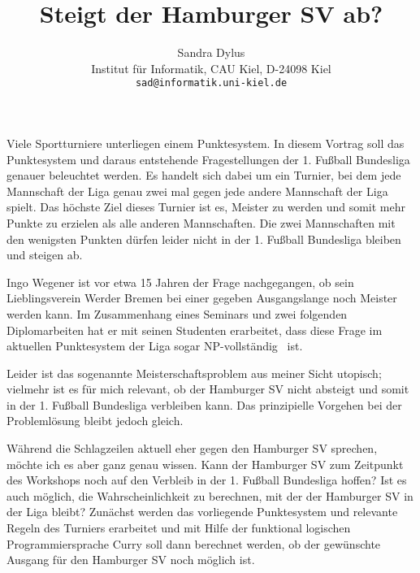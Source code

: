 \documentclass[
12pt, %
a4paper, %
oneside, %
]{scrartcl}
\title{Steigt der Hamburger SV ab?}
\author{Sandra Dylus\\Institut f\"ur Informatik, CAU Kiel, D-24098 Kiel\\\texttt{sad@informatik.uni-kiel.de}}
\date{}
\begin{document}
\maketitle

Viele Sportturniere unterliegen einem Punktesystem. %
In diesem Vortrag soll das Punktesystem und daraus entstehende
Fragestellungen der 1. Fu\ss{}ball Bundesliga genauer beleuchtet
werden. %
Es handelt sich dabei um ein Turnier, bei dem jede Mannschaft der Liga
genau zwei mal gegen jede andere Mannschaft der Liga spielt. %
Das h\"ochste Ziel dieses Turnier ist es, Meister zu werden und somit
mehr Punkte zu erzielen als alle anderen Mannschaften. %
Die zwei Mannschaften mit den wenigsten Punkten d\"urfen leider nicht
in der 1. Fu\ss{}ball Bundesliga bleiben und steigen ab. %

Ingo Wegener ist vor etwa 15 Jahren der Frage nachgegangen, ob sein
Lieblingsverein Werder Bremen bei einer gegeben Ausgangslange noch
Meister werden kann. %
Im Zusammenhang eines Seminars und zwei folgenden Diplomarbeiten hat
er mit seinen Studenten erarbeitet, dass diese Frage im aktuellen
Punktesystem der Liga sogar NP-vollst\"andig~\cite{threePointRule} ist. %

Leider ist das sogenannte Meisterschaftsproblem aus meiner Sicht
utopisch; vielmehr ist es f\"ur mich relevant, ob der Hamburger SV
nicht absteigt und somit in der 1. Fu\ss{}ball Bundesliga verbleiben
kann. %
Das prinzipielle Vorgehen bei der Probleml\"osung bleibt jedoch
gleich. %

W\"ahrend die Schlagzeilen aktuell eher gegen den Hamburger SV
sprechen, m\"ochte ich es aber ganz genau wissen. %
Kann der Hamburger SV zum Zeitpunkt des Workshops noch auf den
Verbleib in der 1. Fu\ss{}ball Bundesliga hoffen? %
Ist es auch m\"oglich, die Wahrscheinlichkeit zu berechnen,
mit der der Hamburger SV in der Liga bleibt? %
Zun\"achst werden das vorliegende Punktesystem und relevante Regeln des
Turniers erarbeitet und mit Hilfe der funktional logischen
Programmiersprache Curry soll dann berechnet werden, ob der gew\"unschte
Ausgang f\"ur den Hamburger SV noch m\"oglich ist. %



\end{document}

